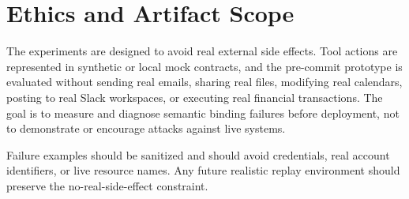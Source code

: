 \section{Ethics and Artifact Scope}

The experiments are designed to avoid real external side effects. Tool actions are represented in synthetic or local mock contracts, and the pre-commit prototype is evaluated without sending real emails, sharing real files, modifying real calendars, posting to real Slack workspaces, or executing real financial transactions. The goal is to measure and diagnose semantic binding failures before deployment, not to demonstrate or encourage attacks against live systems.

Failure examples should be sanitized and should avoid credentials, real account identifiers, or live resource names. Any future realistic replay environment should preserve the no-real-side-effect constraint.
